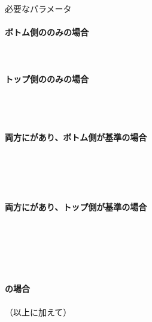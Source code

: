 \begin{Parameter}{必要なパラメータ}
\paragraph*{ボトム側の\Outcut のみの場合}
\PMBottomOutcutACwidth
\PMBottomOutcutBDwidth
\PMBottomOutcutConerR
\PMBottomOutcutLength\\
\PMBottomEndACID
\PMBottomOutcutAsideThickness
\PMPlatingThk
\tcbline*
\paragraph*{トップ側の\Outcut のみの場合}
\PMTopOutcutACwidth
\PMTopOutcutBDwidth
\PMTopOutcutCornerR\\
\PMTopOutcutLength
\PMKeywayPos
\PMKeywayWidth\\
\PMTopEndACID
\PMTopOutcutAsideThickness
\PMPlatingThk
\tcbline*
\paragraph*{両方に\Outcut があり、ボトム側が基準の場合}
\PMBottomOutcutACwidth
\PMBottomOutcutBDwidth
\PMBottomOutcutConerR
\PMBottomOutcutLength\\
\PMBottomEndACID
\PMBottomOutcutAsideThickness
\PMPlatingThk\\
\PMTopOutcutACwidth
\PMTopOutcutBDwidth
\PMTopOutcutCornerR
\PMTopOutcutLength\\
\PMKeywayPos
\PMKeywayWidth
\PMCenterlineEndFaceDifAC
\tcbline*
\paragraph*{両方に\Outcut があり、トップ側が基準の場合}
\PMTopOutcutACwidth
\PMTopOutcutBDwidth
\PMTopOutcutCornerR\\
\PMTopOutcutLength
\PMKeywayPos
\PMKeywayWidth\\
\PMTopEndACID
\PMTopOutcutAsideThickness
\PMPlatingThk\\
\PMBottomOutcutACwidth
\PMBottomOutcutBDwidth
\PMBottomOutcutConerR
\PMBottomOutcutLength\\
\PMCenterlineEndFaceDifAC
\tcbline*
\paragraph*{\CurvedOutcut の場合}
（以上に加えて）\PMCenterCurvatureRadius
\end{Parameter}

